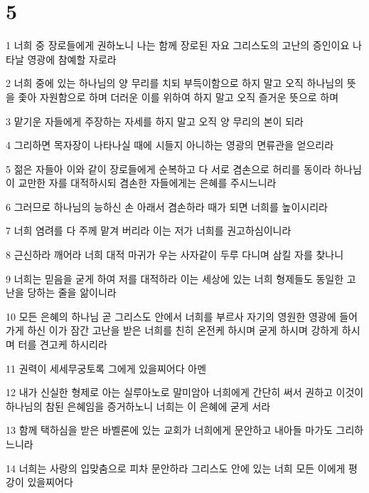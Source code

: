 \chapter{5}

\par 1 너희 중 장로들에게 권하노니 나는 함께 장로된 자요 그리스도의 고난의 증인이요 나타날 영광에 참예할 자로라
\par 2 너희 중에 있는 하나님의 양 무리를 치되 부득이함으로 하지 말고 오직 하나님의 뜻을 좇아 자원함으로 하며 더러운 이를 위하여 하지 말고 오직 즐거운 뜻으로 하며
\par 3 맡기운 자들에게 주장하는 자세를 하지 말고 오직 양 무리의 본이 되라
\par 4 그리하면 목자장이 나타나실 때에 시들지 아니하는 영광의 면류관을 얻으리라
\par 5 젊은 자들아 이와 같이 장로들에게 순복하고 다 서로 겸손으로 허리를 동이라 하나님이 교만한 자를 대적하시되 겸손한 자들에게는 은혜를 주시느니라
\par 6 그러므로 하나님의 능하신 손 아래서 겸손하라 때가 되면 너희를 높이시리라
\par 7 너희 염려를 다 주께 맡겨 버리라 이는 저가 너희를 권고하심이니라
\par 8 근신하라 깨어라 너희 대적 마귀가 우는 사자같이 두루 다니며 삼킬 자를 찾나니
\par 9 너희는 믿음을 굳게 하여 저를 대적하라 이는 세상에 있는 너희 형제들도 동일한 고난을 당하는 줄을 앎이니라
\par 10 모든 은혜의 하나님 곧 그리스도 안에서 너희를 부르사 자기의 영원한 영광에 들어가게 하신 이가 잠간 고난을 받은 너희를 친히 온전케 하시며 굳게 하시며 강하게 하시며 터를 견고케 하시리라
\par 11 권력이 세세무궁토록 그에게 있을찌어다 아멘
\par 12 내가 신실한 형제로 아는 실루아노로 말미암아 너희에게 간단히 써서 권하고 이것이 하나님의 참된 은혜임을 증거하노니 너희는 이 은혜에 굳게 서라
\par 13 함께 택하심을 받은 바벨론에 있는 교회가 너희에게 문안하고 내아들 마가도 그리하느니라
\par 14 너희는 사랑의 입맞춤으로 피차 문안하라 그리스도 안에 있는 너희 모든 이에게 평강이 있을찌어다


